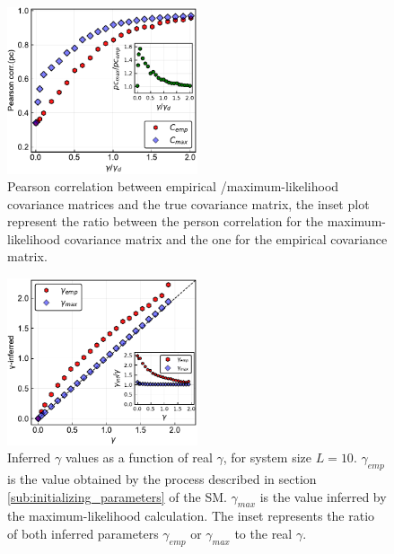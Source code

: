 \documentclass[preprint,amsmath,amssymb,superscriptaddress,showpacs,pre]{revtex4-1}
\begin{document}
\begin{figure}[!htb]
	\centering
	\includegraphics[keepaspectratio=true,width=0.5\textwidth]{Figures/corr_C_L10_balanced_tree_100_rep.pdf}
	\caption{ Pearson correlation between empirical /maximum-likelihood   covariance matrices and the true covariance matrix, the inset plot represent the ratio between the person correlation for the  maximum-likelihood covariance matrix and the one for the empirical covariance matrix.}
	\label{fig:pears_L10}
\end{figure}


\begin{figure}[!htb]
	\centering
	\includegraphics[keepaspectratio=true,width=0.5\textwidth]{Figures/scatter_gamma_L10_100.pdf}
	\caption{Inferred $\gamma$ values as a function of real $\gamma$, for system size $L=10$. $\gamma_{emp}$ is the value obtained by the process described in section \ref{sub:initializing_parameters} of the SM. $\gamma_{max}$ is the value inferred by the maximum-likelihood calculation. 
	The inset represents the ratio of both inferred parameters $\gamma_{emp}$ or $\gamma_{max}$ to the real $\gamma$. }
	\label{fig:scatter_gamma_L10}
\end{figure}
\end{document}
